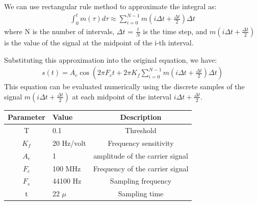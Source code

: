 \documentclass[journal,5pt,twocolumn]{IEEEtran}
\begin{document}
\begin{enumerate}
 \fi
 
We can use rectangular rule method to approximate the integral as:
\begin{align}
\int_{0}^t m(\tau) d\tau \approx \sum_{i=0}^{N-1} m\left(i \Delta t + \frac{\Delta t}{2}\right) \Delta t
\end{align}
where N is the number of intervals, $\Delta t$ = $\frac{t}{N}$ is the time step, and $m\left(i \Delta t + \frac{\Delta t}{2}\right)$ is the value of the signal at the midpoint of the i-th interval.

Substituting this approximation into the original equation, we have:
\begin{align}
s(t) = A_c \cos \left(2 \pi F_c t +2\pi K_{f} \sum_{i=0}^{N-1} m\left(i \Delta t + \frac{\Delta t}{2}\right) \Delta t\right)
\end{align}
This equation can be evaluated numerically using the discrete samples of the signal $m\left(i \Delta t + \frac{\Delta t}{2}\right)$ at each midpoint of the interval $i\Delta t + \frac{\Delta t}{2}. $
 
 
 
 
    \begin{tabular}{|c|l|c|}
    \hline 
    \textbf{Parameter} & \textbf{Value} &\textbf{Description} \\ \hline
    T&0.1&Threshold\\
    $K_{f}$ & 20 Hz/volt & Frequency sensitivity \\ 
    $A_c$ & 1  & amplitude of the carrier signal\\ 
    $F_c $& 100 MHz & Frequency of the carrier signal\\ 
    $F_s$ & 44100 Hz & Sampling frequency\\ 
    t     & 22 $\mu$ & Sampling time\\  \hline
    \end{tabular}
    \\




\end{enumerate}
\end{document}
